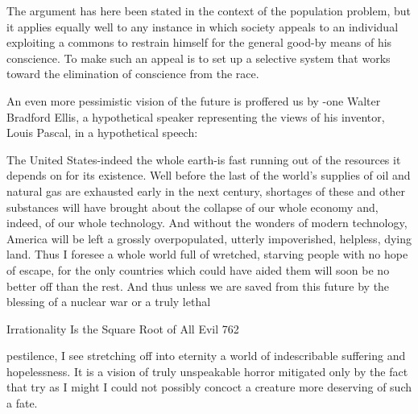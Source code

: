    The argument has here been stated in the context of the population problem, but
   it applies equally well to any instance in which society appeals to an individual
   exploiting a commons to restrain himself for the general good-by means of his
   conscience. To make such an appeal is to set up a selective system that works
   toward the elimination of conscience from the race.

        An even more pessimistic vision of the future is proffered us by -one Walter
Bradford Ellis, a hypothetical speaker representing the views of his inventor, Louis
Pascal, in a hypothetical speech:

   The United States-indeed the whole earth-is fast running out of the resources it
   depends on for its existence. Well before the last of the world's supplies of oil
   and natural gas are exhausted early in the next century, shortages of these and
   other substances will have brought about the collapse of our whole economy
   and, indeed, of our whole technology. And without the wonders of modern
   technology, America will be left a grossly overpopulated, utterly impoverished,
   helpless, dying land. Thus I foresee a whole world full of wretched, starving
   people with no hope of escape, for the only countries which could have aided
   them will soon be no better off than the rest. And thus unless we are saved from
   this future by the blessing of a nuclear war or a truly lethal




Irrationality Is the Square Root of All Evil                                         762

   pestilence, I see stretching off into eternity a world of indescribable suffering
   and hopelessness. It is a vision of truly unspeakable horror mitigated only by the
   fact that try as I might I could not possibly concoct a creature more deserving of
   such a fate.


